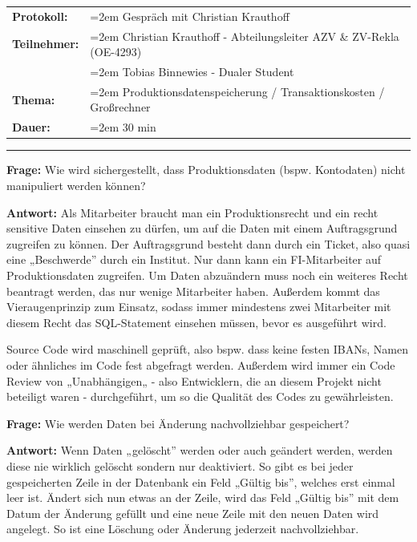 \documentclass[12pt, a4paper]{article}
\begin{document}
{\label{appendix: Anhang 3}

\begin{tabular}{p{2.5 cm}>{\raggedright\arraybackslash\hangindent=2em}p{11.8 cm}}
    \textbf{Protokoll:} & Gespräch mit Christian Krauthoff \\
    \textbf{Teilnehmer:} & Christian Krauthoff - Abteilungsleiter AZV \break \& ZV-Rekla (OE-4293) \\
    & Tobias Binnewies - Dualer Student \\
    \textbf{Thema:} & Produktionsdatenspeicherung / Transaktionskosten / Großrechner \\
    \textbf{Dauer:} & 30 min
    \end{tabular}
    

\bigbreak
\noindent\rule[1ex]{\textwidth}{1pt} %
\bigbreak

\textbf{Frage:} 
\label{i1:f1}
Wie wird sichergestellt, dass Produktionsdaten (bspw. Kontodaten) nicht manipuliert werden können?


\textbf{Antwort:} 
Als Mitarbeiter braucht man ein Produktionsrecht und ein recht sensitive Daten einsehen zu dürfen, um auf die Daten mit einem Auftragsgrund zugreifen zu können. Der Auftragsgrund besteht dann durch ein Ticket, also quasi eine „Beschwerde” durch ein Institut.
Nur dann kann ein FI-Mitarbeiter auf Produktionsdaten zugreifen.
Um Daten abzuändern muss noch ein weiteres Recht beantragt werden, das nur wenige Mitarbeiter haben.
Außerdem kommt das Vieraugenprinzip zum Einsatz, sodass immer mindestens zwei Mitarbeiter mit diesem Recht das SQL-Statement einsehen müssen, bevor es ausgeführt wird.

Source Code wird maschinell geprüft, also bspw. dass keine festen IBANs, Namen oder ähnliches im Code fest abgefragt werden.
Außerdem wird immer ein Code Review von „Unabhängigen„ - also Entwicklern, die an diesem Projekt nicht beteiligt waren - durchgeführt, um so die Qualität des Codes zu gewährleisten.

\bigbreak
\bigbreak

\textbf{Frage:}
\label{i1:f2}
Wie werden Daten bei Änderung nachvollziehbar gespeichert?


\textbf{Antwort:}
Wenn Daten „gelöscht” werden oder auch geändert werden, werden diese nie wirklich gelöscht sondern nur deaktiviert.
So gibt es bei jeder gespeicherten Zeile in der Datenbank ein Feld „Gültig bis”, welches erst einmal leer ist. 
Ändert sich nun etwas an der Zeile, wird das Feld „Gültig bis” mit dem Datum der Änderung gefüllt und eine neue Zeile mit den neuen Daten wird angelegt.
So ist eine Löschung oder Änderung jederzeit nachvollziehbar.

}
\end{document}
